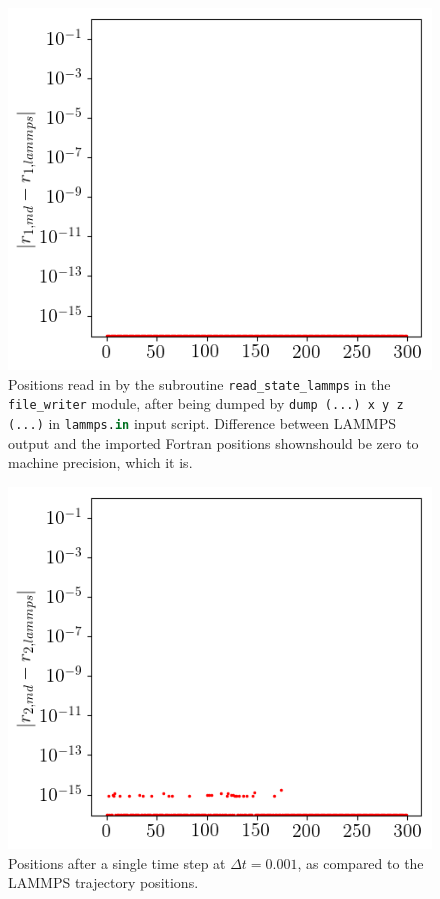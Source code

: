 \documentclass[a4paper, twocolumn]{article}
\newcommand{\inlinepy}[1]{\lstinline[language={python}]{#1}}
\begin{document}
\begin{figure}
\centering
\includegraphics[width=0.8\linewidth]{positions-firststep.png}
\caption{Positions read in by the subroutine \inlinepy{read_state_lammps} in the \inlinepy{file_writer} module, after being dumped by \inlinepy{dump (...) x y z (...)} in \inlinepy{lammps.in} input script. Difference between LAMMPS output and the imported Fortran positions shown\textemdash should be zero to machine precision, which it is.\label{fig:1}}
\end{figure}
\begin{figure}
\centering
\includegraphics[width=0.8\linewidth]{positions-secondstep.png}
\caption{Positions after a single time step at $\Delta t=0.001$, as compared to the LAMMPS trajectory positions. \label{fig:2}}
\end{figure}
\end{document}
